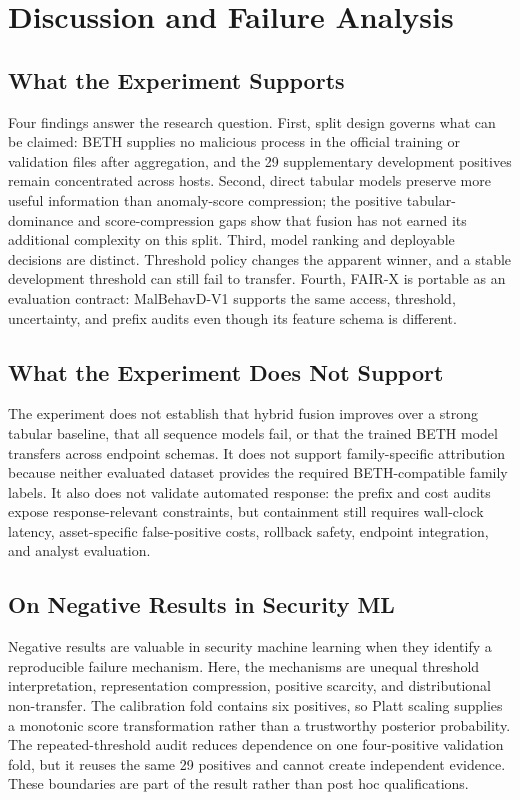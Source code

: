\documentclass[10pt,journal,compsoc]{IEEEtran}
\begin{document}
\section{Discussion and Failure Analysis}
\label{sec:discussion}

\subsection{What the Experiment Supports}

Four findings answer the research question. First, split design governs what can be claimed: BETH supplies no malicious process in the official training or validation files after aggregation, and the 29 supplementary development positives remain concentrated across hosts. Second, direct tabular models preserve more useful information than anomaly-score compression; the positive tabular-dominance and score-compression gaps show that fusion has not earned its additional complexity on this split. Third, model ranking and deployable decisions are distinct. Threshold policy changes the apparent winner, and a stable development threshold can still fail to transfer. Fourth, FAIR-X is portable as an evaluation contract: MalBehavD-V1 supports the same access, threshold, uncertainty, and prefix audits even though its feature schema is different.

\subsection{What the Experiment Does Not Support}

The experiment does not establish that hybrid fusion improves over a strong tabular baseline, that all sequence models fail, or that the trained BETH model transfers across endpoint schemas. It does not support family-specific attribution because neither evaluated dataset provides the required BETH-compatible family labels. It also does not validate automated response: the prefix and cost audits expose response-relevant constraints, but containment still requires wall-clock latency, asset-specific false-positive costs, rollback safety, endpoint integration, and analyst evaluation.

\subsection{On Negative Results in Security ML}

Negative results are valuable in security machine learning when they identify a reproducible failure mechanism. Here, the mechanisms are unequal threshold interpretation, representation compression, positive scarcity, and distributional non-transfer. The calibration fold contains six positives, so Platt scaling supplies a monotonic score transformation rather than a trustworthy posterior probability. The repeated-threshold audit reduces dependence on one four-positive validation fold, but it reuses the same 29 positives and cannot create independent evidence. These boundaries are part of the result rather than post hoc qualifications.
\end{document}
